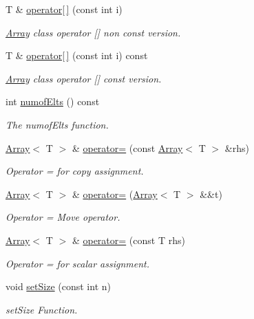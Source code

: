 \begin{DoxyCompactItemize}
T \& \hyperlink{classArray_afc1f545d7ae1da746439a31022e0cc9b}{operator\mbox{[}$\,$\mbox{]}} (const int i)
\begin{DoxyCompactList}\small\item\em \hyperlink{classArray}{Array} class operator \mbox{[}\mbox{]} non const version. \end{DoxyCompactList}\item 
T \& \hyperlink{classArray_a33f90c9b670e93143f8ce3f1feace3f6}{operator\mbox{[}$\,$\mbox{]}} (const int i) const 
\begin{DoxyCompactList}\small\item\em \hyperlink{classArray}{Array} class operator \mbox{[}\mbox{]} const version. \end{DoxyCompactList}\item 
int \hyperlink{classArray_a71041b261f55a69da4abe90437e3d663}{numof\+Elts} () const 
\begin{DoxyCompactList}\small\item\em The numof\+Elts function. \end{DoxyCompactList}\item 
\hyperlink{classArray}{Array}$<$ T $>$ \& \hyperlink{classArray_a55b672825edb2cb26d7e01de911c6635}{operator=} (const \hyperlink{classArray}{Array}$<$ T $>$ \&rhs)
\begin{DoxyCompactList}\small\item\em Operator = for copy assignment. \end{DoxyCompactList}\item 
\hyperlink{classArray}{Array}$<$ T $>$ \& \hyperlink{classArray_a1738dca17fb8ad6fb877201d76162063}{operator=} (\hyperlink{classArray}{Array}$<$ T $>$ \&\&t)
\begin{DoxyCompactList}\small\item\em Operator = Move operator. \end{DoxyCompactList}\item 
\hyperlink{classArray}{Array}$<$ T $>$ \& \hyperlink{classArray_abcfe8458bea5f78752ae329887db322c}{operator=} (const T rhs)
\begin{DoxyCompactList}\small\item\em Operator = for scalar assignment. \end{DoxyCompactList}\item 
void \hyperlink{classArray_a2ead650973657d9946f8d1ed645a48dd}{set\+Size} (const int n)
\begin{DoxyCompactList}\small\item\em set\+Size Function. \end{DoxyCompactList}\item 

\end{DoxyCompactItemize}
